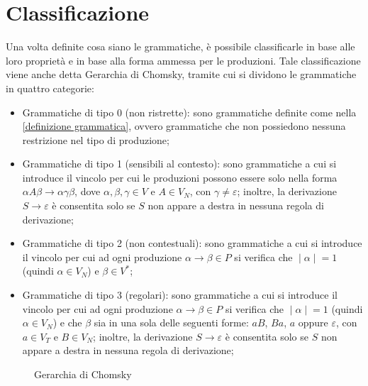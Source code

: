   \section{Classificazione}
  Una volta definite cosa siano le grammatiche, è possibile classificarle in base alle loro proprietà e in base alla forma ammessa per le produzioni. Tale classificazione viene anche detta Gerarchia di Chomsky, tramite cui si dividono le grammatiche in quattro categorie:
  \begin{itemize}
    \item Grammatiche di tipo 0 (non ristrette): sono grammatiche definite come nella \ref{definizione grammatica}, ovvero grammatiche che non possiedono nessuna restrizione nel tipo di produzione;
    \item Grammatiche di tipo 1 (sensibili al contesto): sono grammatiche a cui si introduce il vincolo per cui le produzioni possono essere solo nella forma \(\alpha A\beta\to\alpha\gamma\beta\), dove \(\alpha, \beta, \gamma\in V\) e \(A\in V_N\), con \(\gamma\neq\varepsilon\); inoltre, la derivazione \(S\to\varepsilon\) è consentita solo se \(S\) non appare a destra in nessuna regola di derivazione;
    \item Grammatiche di tipo 2 (non contestuali): sono grammatiche a cui si introduce il vincolo per cui ad ogni produzione \(\alpha\to\beta \in P\) si verifica che \(\;|\;\alpha\;|\; =1\) (quindi \(\alpha \in V_N\)) e \(\beta\in V^*\);
    \item Grammatiche di tipo 3 (regolari): sono grammatiche a cui si introduce il vincolo per cui ad ogni produzione \(\alpha\to\beta \in P\) si verifica che \(\;|\;\alpha\;|\; = 1\) (quindi \(\alpha \in V_N\)) e che \(\beta\) sia in una sola delle seguenti forme: \(aB\), \(Ba\), \(a\) oppure \(\varepsilon\), con \(a\in V_T\) e \(B\in V_N\); inoltre, la derivazione \(S\to\varepsilon\) è consentita solo se \(S\) non appare a destra in nessuna regola di derivazione;
  \end{itemize} 

  \begin{figure}[!h]
    \begin{center}    
    \end{center}
    \caption{Gerarchia di Chomsky}    
  \end{figure}

